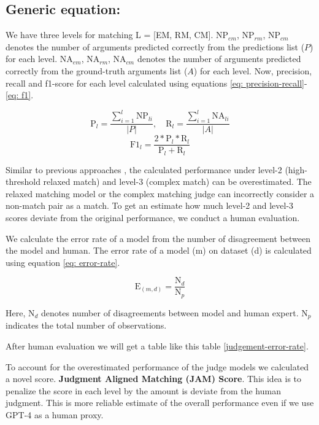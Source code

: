 \subsection{Generic equation:} We have three levels for matching L = [EM, RM, CM]. $\text{NP}_{em}$, $\text{NP}_{rm}$, $\text{NP}_{cm}$ denotes the number of arguments predicted correctly from the predictions list ($P$) for each level. $\text{NA}_{em}$, $\text{NA}_{rm}$, $\text{NA}_{cm}$ denotes the number of arguments predicted correctly from the ground-truth arguments list ($A$) for each level. Now, precision, recall and f1-score for each level calculated using equations \ref{eq: precision-recall}-\ref{eq: f1}.

\begin{equation}
   \text{P}_l = \frac{\sum_{i=1}^{l} \text{NP}_{li}}{|P|},  \quad
   \text{R}_l = \frac{\sum_{i=1}^{l} \text{NA}_{li}}{|A|}
   \label{eq: precision-recall}
\end{equation}
\begin{equation}
   \text{F1}_l = \frac{2 * \text{P}_l * \text{R}_l}{\text{P}_l + \text{R}_l}
   \label{eq: f1}
\end{equation}

Similar to previous approaches \cite{}, the calculated performance under level-2 (high-threshold relaxed match) and level-3 (complex match) can be overestimated. The relaxed matching model or the complex matching judge can incorrectly consider a non-match pair as a match. To get an estimate how much level-2 and level-3 scores deviate from the original performance, we conduct a human evaluation. 

We calculate the error rate of a model from the number of disagreement between the model and human. The error rate of a model (m) on dataset (d) is calculated using equation \ref{eq: error-rate}. 

\begin{equation}
    \text{E}_{(m,d)} = \frac{\text{N}_d}{\text{N}_p}
    \label{eq: error-rate}
\end{equation}

Here, $\text{N}_d$ denotes number of disagreements between model and human expert. $\text{N}_p$ indicates the total number of observations. 

After human evaluation we will get a table like this table \ref{judgement-error-rate}. 

To account for the overestimated performance of the judge models we calculated a novel score. \textbf{Judgment Aligned Matching (JAM) Score}. This idea is to penalize the score in each level by the amount is deviate from the human judgment. This is more reliable estimate of the overall performance even if we use GPT-4 as a human proxy. 


